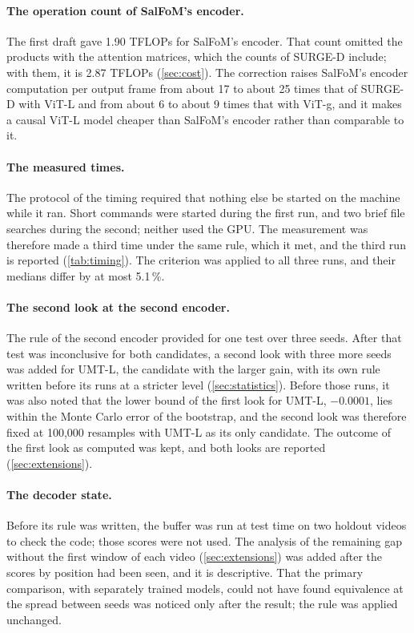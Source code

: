 \paragraph{The operation count of SalFoM's encoder.} The first draft gave 1.90
\acrshort{TFLOPs} for SalFoM's encoder. That count omitted the products with the
attention matrices, which the counts of SURGE-D include; with them, it is 2.87
\acrshort{TFLOPs} (\cref{sec:cost}). The correction raises SalFoM's encoder
computation per output frame from about 17 to about 25 times that of SURGE-D
with \acrshort{ViT}-L and from about 6 to about 9 times that with
\acrshort{ViT}-g, and it makes a causal \acrshort{ViT}-L model cheaper than
SalFoM's encoder rather than comparable to it.

\paragraph{The measured times.} The protocol of the timing required that
nothing else be started on the machine while it ran. Short commands were
started during the first run, and two brief file searches during the second;
neither used the \acrshort{GPU}. The measurement was therefore made a third time
under the same rule, which it met, and the third run is reported
(\cref{tab:timing}). The criterion was applied to all three runs, and their
medians differ by at most 5.1\,\%.

\paragraph{The second look at the second encoder.} The rule of the second
encoder provided for one test over three seeds. After that test was
inconclusive for both candidates, a second look with three more seeds was
added for \acrshort{UMT}-L, the candidate with the larger gain, with its own rule
written before its runs at a stricter level (\cref{sec:statistics}). Before
those runs, it was also noted that the lower bound of the first look for
\acrshort{UMT}-L, $-0.0001$, lies within the Monte Carlo error of the bootstrap,
and the second look was therefore fixed at 100,000 resamples with
\acrshort{UMT}-L as its only candidate. The outcome of the first look as
computed was kept, and both looks are reported (\cref{sec:extensions}).

\paragraph{The decoder state.} Before its rule was written, the buffer was run
at test time on two holdout videos to check the code; those scores were not
used. The analysis of the remaining gap without the first window of each video
(\cref{sec:extensions}) was added after the scores by position had been seen,
and it is descriptive. That the primary comparison, with separately trained
models, could not have found equivalence at the spread between seeds was
noticed only after the result; the rule was applied unchanged.

